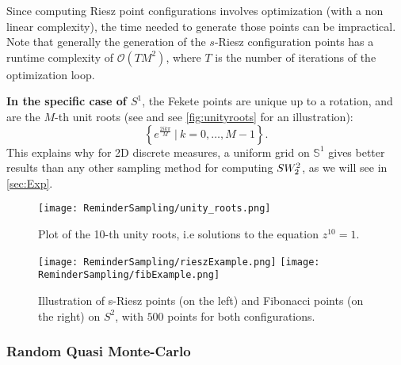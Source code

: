 \begin{Rk}Since computing Riesz point configurations involves optimization (with a non linear complexity), the time needed to generate those points can be impractical. Note that generally the generation of the $s$-Riesz configuration points has a {runtime complexity} of $\mathcal{O}(T M^2)$, where $T$ is the number of iterations of the optimization loop.
\end{Rk}

\noindent \textbf{In the specific case of $S^1$}, the Fekete points are unique up to a rotation, and are the $M$-th unit roots (see \citep{GOTZ200362} and see \autoref{fig:unityroots} for an illustration):
$$\left\lbrace e^{\frac{2ik\pi}{M}} \ | \ k = 0,\hdots,M-1 \right\rbrace.$$
This explains why for 2D discrete measures, a uniform grid on $\mathbb{S}^1$ gives better results than any other sampling method for computing $SW_2^2$, as we will see in \autoref{sec:Exp}.

\begin{figure}[h!]
\begin{center}
\texttt{[image: ReminderSampling/unity\_roots.png]}
\caption{{Plot} of the 10-th unity roots, i.e  solutions to the equation $z^{10} = 1$.}
\label{fig:unityroots}
\end{center}
\end{figure}

\begin{figure}[h!]
\centering
\texttt{[image: ReminderSampling/rieszExample.png]}
\hspace{1cm}
\texttt{[image: ReminderSampling/fibExample.png]}
\caption{Illustration of s-Riesz points (on the left) and Fibonacci points (on the right) {on $S^2$}, with $500$ points for both configurations. }
\label{fig:rieszAndfig}
\end{figure}


\subsubsection{Random Quasi Monte-Carlo} \label{par:rqmc} 

